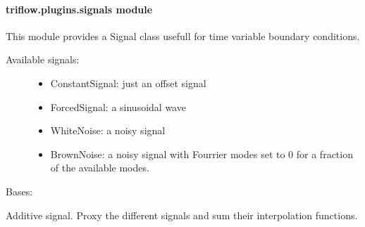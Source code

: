 \documentclass[letterpaper,10pt,english]{sphinxmanual}
\begin{document}
\paragraph{triflow.plugins.signals module}
\label{\detokenize{triflow.plugins:triflow-plugins-signals-module}}\label{\detokenize{triflow.plugins:module-triflow.plugins.signals}}
This module provides a Signal class usefull for time variable boundary
conditions.
\begin{description}
\item[{Available signals:}] \leavevmode\begin{itemize}
\item {} 
ConstantSignal: just an offset signal

\item {} 
ForcedSignal: a sinusoidal wave

\item {} 
WhiteNoise: a noisy signal

\item {} 
BrownNoise: a noisy signal with Fourrier modes set to 0 for a fraction of the available modes.

\end{itemize}

\end{description}

\begin{fulllineitems}
\label{\detokenize{triflow.plugins:triflow.plugins.signals.AdditiveSignal}}
Bases: {\hyperref[\detokenize{triflow.plugins:triflow.plugins.signals.Signal}]{}}

Additive signal. Proxy the different signals and sum their interpolation functions.

\end{fulllineitems}

\end{document}
